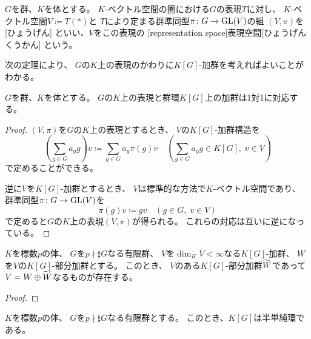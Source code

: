 \documentclass[report]{jlreq}
\begin{document}
\begin{definition}
    $G$を群、$K$を体とする。
    $K$-ベクトル空間の圏における$G$の表現$T$に対し、
    $K$-ベクトル空間$V \coloneqq T(*)$と
    $T$により定まる群準同型$\pi \colon G \to \operatorname{\mathrm{GL}}(V)$の組
    $(V, \pi)$を
    [ひょうげん]
    といい、$V$をこの表現の
    [representation space]{表現空間}[ひょうげんくうかん]
    という。
\end{definition}

次の定理により、
$G$の$K$上の表現のかわりに$K[G]$-加群を考えればよいことがわかる。

\begin{theorem}
    $G$を群、$K$を体とする。
    $G$の$K$上の表現と群環$K[G]$上の加群は1対1に対応する。
\end{theorem}

\begin{proof}
    $(V, \pi)$を$G$の$K$上の表現とするとき、
    $V$の$K[G]$-加群構造を
    \begin{equation}
        \left(\sum_{g \in G} a_g g\right) v
            \coloneqq \sum_{g \in G} a_g \pi(g) v
            \quad
            \left(
                \sum_{g \in G} a_g g \in K[G], \;
                v \in V
            \right)
    \end{equation}
    で定めることができる。

    逆に$V$を$K[G]$-加群とするとき、
    $V$は標準的な方法で$K$-ベクトル空間であり、
    群準同型$\pi \colon G \to \operatorname{\mathrm{GL}}(V)$を
    \begin{equation}
        \pi(g) v \coloneqq gv
            \quad
            (g \in G, \; v \in V)
    \end{equation}
    で定めると$G$の$K$上の表現$(V, \pi)$が得られる。
    これらの対応は互いに逆になっている。
\end{proof}

\begin{theorem}
    $K$を標数$p$の体、
    $G$を$p \nmid \sharp G$なる有限群、
    $V$を$\dim_K V < \infty$なる$K[G]$-加群、
    $W$を$V$の$K[G]$-部分加群とする。
    このとき、
    $V$のある$K[G]$-部分加群$\widetilde{W}$であって
    $V = W \oplus \widetilde{W}$なるものが存在する。
\end{theorem}

\begin{proof}
    \TODO{}
\end{proof}

\begin{theorem}
    $K$を標数$p$の体、
    $G$を$p \nmid \sharp G$なる有限群とする。
    このとき、$K[G]$は半単純環である。
\end{theorem}
\end{document}
